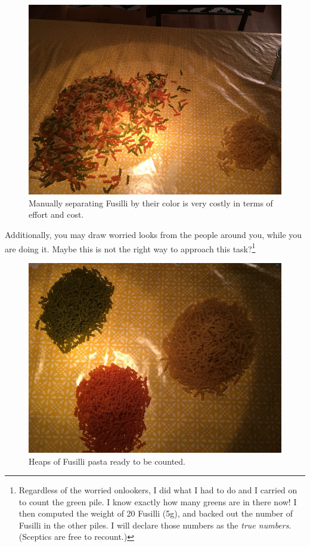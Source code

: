 \documentclass[]{book}
\begin{document}
\begin{figure}
\includegraphics[width=0.9\linewidth]{images/pasta2} \caption{Manually separating Fusilli by their color is very costly in terms of effort and cost.}\label{fig:pasta2}
\end{figure}

Additionally, you may draw worried looks from the people around you,
while you are doing it. Maybe this is not the right way to approach this
task?\footnote{Regardless of the worried onlookers, I did what I had to
  do and I carried on to count the green pile. I know exactly how many
  greens are in there now! I then computed the weight of 20 Fusilli
  (5g), and backed out the number of Fusilli in the other piles. I will
  declare those numbers as the \emph{true numbers}. (Sceptics are free
  to recount.)}

\begin{figure}
\includegraphics[width=0.9\linewidth]{images/pasta3} \caption{Heaps of Fusilli pasta ready to be counted.}\label{fig:pasta3}
\end{figure}
\end{document}
